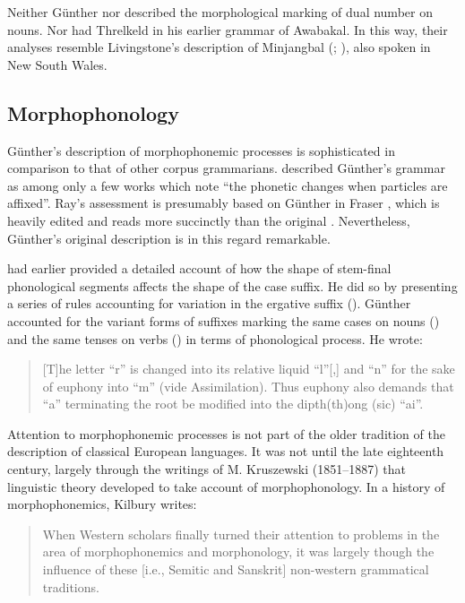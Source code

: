 Neither Günther nor \citet[485]{hale_languages_1846} described the morphological marking of dual number on nouns. Nor had Threlkeld in his earlier grammar of Awabakal. In this way, their analyses resemble Livingstone’s description of Minjangbal (\citeyear{livingstone_grammar_1892}; ), also spoken in New South Wales.

\subsection{Morphophonology}
\label{sec:key:4.4.2}

Günther’s description of morphophonemic processes is sophisticated in comparison to that of other corpus grammarians. \citet[4]{ray_aboriginal_1925} described Günther’s grammar as among only a few works which note “the phonetic changes when particles are affixed”. Ray’s assessment is presumably based on Günther in Fraser \citep[59]{gunther_grammar_1892}, which is heavily edited and reads more succinctly than the original \citep[348]{gunther_lecture_1840}. Nevertheless, Günther’s original description is in this regard remarkable. 

\citet[11]{threlkeld_australian_1834} had earlier provided a detailed account of how the shape of stem-final phonological segments affects the shape of the case suffix. He did so by presenting a series of rules accounting for variation in the ergative suffix (). Günther accounted for the variant forms of suffixes marking the same cases on nouns (\citeyear[348]{gunther_lecture_1840}) and the same tenses on verbs (\citeyear[349]{gunther_lecture_1840}) in terms of phonological process. He wrote: 
\begin{quote}
    [T]he letter “r” is changed into its relative liquid ``l''[,] and “n” for the sake of euphony into “m” (vide Assimilation). Thus euphony also demands that “a” terminating the root be modified into the dipth(th)ong (sic) ``ai''. \citep[349]{gunther_lecture_1840}
\end{quote}

Attention to morphophonemic processes is not part of the older tradition of the description of classical European languages. It was not until the late eighteenth century, largely through the writings of M. Kruszewski (1851--1887) that linguistic theory developed to take account of morphophonology. In a history of morphophonemics, Kilbury writes:

\begin{quote}
    When Western scholars finally turned their attention to problems in the area of morphophonemics and morphonology, it was largely though the influence of these [i.e., Semitic and Sanskrit] non-western grammatical traditions. \citep[13]{kilbury_development_1976}
\end{quote}

